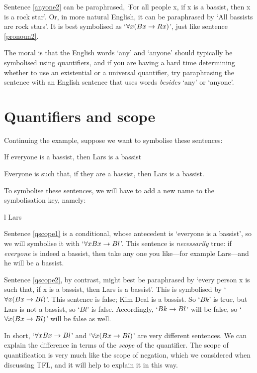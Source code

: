 Sentence \ref{anyone2} can be paraphrased, `For all people x, if x is a bassist, then x is a rock star'. Or, in more natural English, it can be paraphrased by `All bassists are rock stars'. It is best symbolised as `$\forall x(Bx \rightarrow Rx)$', just like sentence \ref{pronoun2}.

The moral is that the English words `any' and `anyone' should typically be symbolised using quantifiers, and if you are having a hard time determining whether to use an existential or a universal quantifier, try paraphrasing the sentence with an English sentence that uses words \emph{besides} `any' or `anyone'.



\section{Quantifiers and scope}
Continuing the example, suppose we want to symbolise these sentences:
	\begin{earg}
		\item[\ex{qscope1}] If everyone is a bassist, then Lars is a bassist
		\item[\ex{qscope2}] Everyone is such that, if they are a bassist, then Lars is a bassist.
	\end{earg}
To symbolise these sentences, we will have to add a new name to the symbolisation key, namely:
	\begin{ekey}
		\item[l] Lars
	\end{ekey}
Sentence \ref{qscope1} is a conditional, whose antecedent is `everyone is a bassist', so we will symbolise it with `$\forall x Bx \rightarrow Bl$'. This sentence is \emph{necessarily} true: if \emph{everyone} is indeed a bassist, then take any one you like---for example Lars---and he will be a bassist. 

Sentence \ref{qscope2}, by contrast, might best be paraphrased by `every person x is such that, if x is a bassist, then Lars is a bassist'. This is symbolised by `$\forall x (Bx \rightarrow Bl)$'. This sentence is false; Kim Deal is a bassist. So `$Bk$' is true, but Lars is not a bassist, so `$Bl$' is false. Accordingly, `$Bk \rightarrow Bl$' will be false, so `$\forall x (Bx \rightarrow Bl)$' will be false as well. 

In short, `$\forall x Bx \rightarrow Bl$' and `$\forall x (Bx \rightarrow Bl)$' are very different sentences. We can explain the difference in terms of the \emph{scope} of the quantifier. The scope of quantification is very much like the scope of negation, which we considered when discussing TFL, and it will help to explain it in this way.

